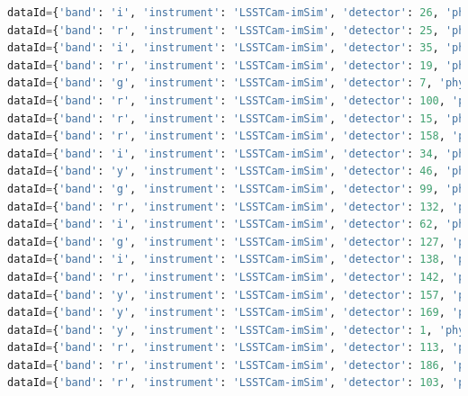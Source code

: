 \documentclass[DM,authoryear,toc]{lsstdoc}
\begin{document}
\begin{lstlisting}[language=Python, basicstyle=\tiny]
dataId={'band': 'i', 'instrument': 'LSSTCam-imSim', 'detector': 26, 'physical_filter': 'i_sim_1.4', 'visit': 1029776} records=None
dataId={'band': 'r', 'instrument': 'LSSTCam-imSim', 'detector': 25, 'physical_filter': 'r_sim_1.4', 'visit': 1049334} records=None
dataId={'band': 'i', 'instrument': 'LSSTCam-imSim', 'detector': 35, 'physical_filter': 'i_sim_1.4', 'visit': 645659} records=None
dataId={'band': 'r', 'instrument': 'LSSTCam-imSim', 'detector': 19, 'physical_filter': 'r_sim_1.4', 'visit': 1006061} records=None
dataId={'band': 'g', 'instrument': 'LSSTCam-imSim', 'detector': 7, 'physical_filter': 'g_sim_1.4', 'visit': 1039948} records=None
dataId={'band': 'r', 'instrument': 'LSSTCam-imSim', 'detector': 100, 'physical_filter': 'r_sim_1.4', 'visit': 1049335} records=None
dataId={'band': 'r', 'instrument': 'LSSTCam-imSim', 'detector': 15, 'physical_filter': 'r_sim_1.4', 'visit': 1052891} records=None
dataId={'band': 'r', 'instrument': 'LSSTCam-imSim', 'detector': 158, 'physical_filter': 'r_sim_1.4', 'visit': 1049335} records=None
dataId={'band': 'i', 'instrument': 'LSSTCam-imSim', 'detector': 34, 'physical_filter': 'i_sim_1.4', 'visit': 1029778} records=None
dataId={'band': 'y', 'instrument': 'LSSTCam-imSim', 'detector': 46, 'physical_filter': 'y_sim_1.4', 'visit': 1012178} records=None
dataId={'band': 'g', 'instrument': 'LSSTCam-imSim', 'detector': 99, 'physical_filter': 'g_sim_1.4', 'visit': 1039916} records=None
dataId={'band': 'r', 'instrument': 'LSSTCam-imSim', 'detector': 132, 'physical_filter': 'r_sim_1.4', 'visit': 1006007} records=None
dataId={'band': 'i', 'instrument': 'LSSTCam-imSim', 'detector': 62, 'physical_filter': 'i_sim_1.4', 'visit': 1013734} records=None
dataId={'band': 'g', 'instrument': 'LSSTCam-imSim', 'detector': 127, 'physical_filter': 'g_sim_1.4', 'visit': 1039948} records=None
dataId={'band': 'i', 'instrument': 'LSSTCam-imSim', 'detector': 138, 'physical_filter': 'i_sim_1.4', 'visit': 1013711} records=None
dataId={'band': 'r', 'instrument': 'LSSTCam-imSim', 'detector': 142, 'physical_filter': 'r_sim_1.4', 'visit': 1052890} records=None
dataId={'band': 'y', 'instrument': 'LSSTCam-imSim', 'detector': 157, 'physical_filter': 'y_sim_1.4', 'visit': 1012086} records=None
dataId={'band': 'y', 'instrument': 'LSSTCam-imSim', 'detector': 169, 'physical_filter': 'y_sim_1.4', 'visit': 1056413} records=None
dataId={'band': 'y', 'instrument': 'LSSTCam-imSim', 'detector': 1, 'physical_filter': 'y_sim_1.4', 'visit': 1034820} records=None
dataId={'band': 'r', 'instrument': 'LSSTCam-imSim', 'detector': 113, 'physical_filter': 'r_sim_1.4', 'visit': 1049335} records=None
dataId={'band': 'r', 'instrument': 'LSSTCam-imSim', 'detector': 186, 'physical_filter': 'r_sim_1.4', 'visit': 1049332} records=None
dataId={'band': 'r', 'instrument': 'LSSTCam-imSim', 'detector': 103, 'physical_filter': 'r_sim_1.4', 'visit': 1049335} records=None  
\end{lstlisting}
\end{document}
